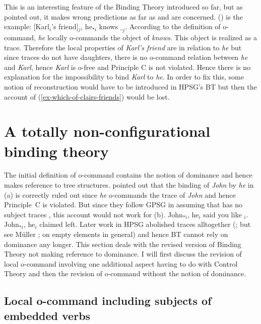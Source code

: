 \documentclass[output=paper
	        ,collection
	        ,collectionchapter
 	        ,biblatex
                ,babelshorthands
                ,newtxmath
                ,draftmode
                ,colorlinks, citecolor=brown
]{langscibook}
\begin{document}
This is an interesting feature of the Binding Theory introduced so far, but as
\citet[Section~20.2]{Mueller99a} pointed out, it makes wrong predictions as far as  and  are
concerned. () is the  example:
\ea
{}[Karl$_i$'s friend]$_j$, he$_{*i}$ knows $\__j$.
\z
According to the definition of o-command, \emph{he} locally o-commands the object of
\emph{knows}. This object is realized as a trace. Therefore the local properties of \emph{Karl's
  friend} are in relation to \emph{he} but since traces do not have daughters, there is no o-command
relation between \emph{he} and \emph{Karl}, hence \emph{Karl} is o-free and Principle C is not
violated. Hence there is no explanation for the impossibility to bind \emph{Karl} to \emph{he}. In
order to fix this, some notion of reconstruction would have to be introduced in HPSG's BT but then
the account of (\ref{ex-which-of-clairs-friends}) would be lost.



\section{A totally non-configurational binding theory}

The initial definition of o-command contains the notion of dominance and hence makes reference to
tree structures. \citet[]{ps2} pointed out that the binding of \emph{John} by \emph{he} in
(a) is correctly ruled out since \emph{he} o-commands the trace of \emph{John} and hence
Principle~C is violated. But since they follow GPSG in assuming that  has no subject traces
\citep[Chapter~4.4]{ps2}, this account would not work for (b). 
\eal
\ex John$_{*i}$, he$_i$ said you like \trace$_i$.
\ex John$_{*i}$, he$_i$ claimed left.
\zl
Later work in HPSG abolished traces alltogether (\citealp*{BMS2001a};  but
see Müller \citeyear{Mueller2004e}; \citeyear[Chapter~19]{MuellerGT-Eng1} on empty elements in general) and hence BT cannot rely on
dominance any longer. This section deals with the revised version of Binding Theory not making
reference to dominance. I will first discuss the revision of local o-command involving one
additional aspect having to do with Control Theory and then the revision of o-command without the
notion of dominance.

\subsection{Local o-command including subjects of embedded verbs}
\end{document}
